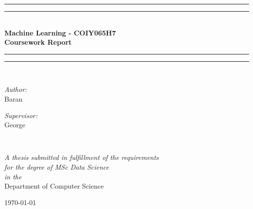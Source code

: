 \documentclass[12pt]{report}
\begin{document}
\begin{titlepage}
    \begin{center}
        \vspace*{.06\textheight}{\scshape\LARGE Birkbeck, University of London\par}\vspace{1.5cm} %
        \rule[0.5ex]{\linewidth}{2pt}\vspace*{-\baselineskip}\vspace*{3.2pt}
        \rule[0.5ex]{\linewidth}{1pt}\\[\baselineskip]
        \huge{\bfseries Machine Learning - COIY065H7\\Coursework Report}\\[4mm]
        \rule[0.5ex]{\linewidth}{1pt}\vspace*{-\baselineskip}\vspace{3.2pt}
        \rule[0.5ex]{\linewidth}{2pt}\\
        [1.5cm]


        \begin{minipage}[t]{0.4\textwidth}
        \begin{flushleft} \large
        \emph{Author:}\\
        {Baran} %
        \end{flushleft}
        \end{minipage}
        \begin{minipage}[t]{0.4\textwidth}
        \begin{flushright} \large
        \emph{Supervisor:} \\
        {George} %
        \end{flushright}
        \end{minipage}\\
        [3cm]

            \vfill

            \large \textit{A thesis submitted in fulfillment of the requirements\\ for the degree of MSc Data Science}\\[0.3cm] %
            \textit{in the}\\[0.4cm]
            Department of Computer Science\\[2cm] %
 
            \vfill

            {\large \today}\\[4cm] %
 
            \vfill
    \end{center}
\end{titlepage}    
\end{document}
